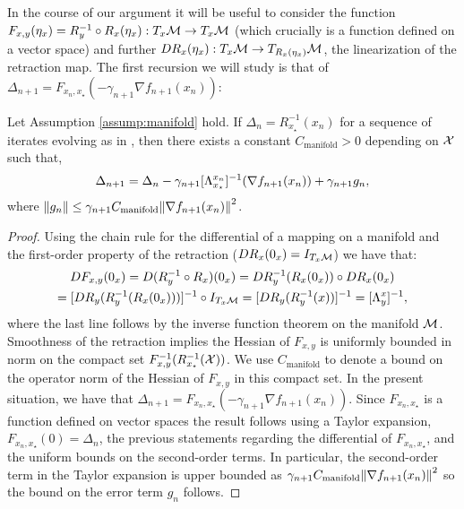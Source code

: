
In the course of our argument it will be useful to consider the function $F_{x, y}(\eta_x) = R_y^{-1} \circ R_x(\eta_x) : T_x \mathcal{M} \to T_x \mathcal{M}$
 (which crucially
is a function defined on a vector space) and further $D R_x(\eta_x) : T_x \mathcal{M} \to T_{R_x(\eta_x)} \mathcal{M}$, the linearization of the retraction map. The first recursion we will study is that of $\Delta_{n+1} = F_{x_n, x_\star}(-\gamma_{n+1} \nabla f_{n+1}(x_n))$:
\begin{lemma}\label{lem:tangent_rec}
Let Assumption \ref{assump:manifold} hold. If $\Delta_n = R_{x_\star}^{-1}(x_n)$ for a sequence of iterates evolving as in  , then there exists a constant $C_{\text{manifold}}>0$ depending on $\mathcal{X}$ such that,
  \[
  \Delta_{n+1} = \Delta_n - \gamma_{n+1} [\Lambda_{x_\star}^{x_n}]^{-1} (\nabla f_{n+1}(x_n)) + \gamma_{n+1} g_n,
  \]  where $\norm{g_n} \leq \gamma_{n+1} C_{\text{manifold}} \norm{\nabla f_{n+1}(x_n)}^2$.
\end{lemma}
\begin{proof}
  Using the chain rule for the differential of a mapping on a manifold and the first-order property of the retraction ($D R_x (0_x) = I_{T_x\mathcal{M}}$)
  we have that:
  \begin{multline*}
      D F_{x, y}(0_x) = D(R_y^{-1} \circ R_x)(0_x) = D R_{y}^{-1}(R_x(0_x)) \circ D R_x(0_x) \\= [D R_y(R_{y}^{-1}(R_x(0_x)))]^{-1} \circ I_{T_x \mathcal{M}} =    [DR_y(R_{y}^{-1}(x))]^{-1}=[\Lambda_{y}^{x}]^{-1},
  \end{multline*}
  where the last line follows by the inverse function theorem on the manifold $\mathcal{M}$.
 Smoothness of the retraction  implies the Hessian of $F_{x, y}$ is uniformly bounded in norm on the compact set $F_{x, y}^{-1}(R_{x_\star}^{-1}(\mathcal{X}))$. We use $C_{\text{manifold}}$ to denote a bound on the operator norm of the Hessian of $F_{x, y}$ in this compact set. In the present situation,
  we have that $\Delta_{n+1} = F_{x_n, x_\star}(-\gamma_{n+1} \nabla f_{n+1}(x_n))$. Since $F_{x_n, x_\star}$ is a function defined on vector spaces the result follows using a Taylor expansion,
  $F_{x_n, x_\star}(0)=\Delta_n$, the previous statements regarding the differential of $F_{x_n, x_\star}$, and the uniform bounds on the second-order terms. In particular, the second-order term in the Taylor expansion is upper bounded as $\gamma_{n+1} C_{\text{manifold}} \norm{\nabla f_{n+1}(x_n)}^2$ so the bound on the error term $g_n$ follows.
\end{proof}
